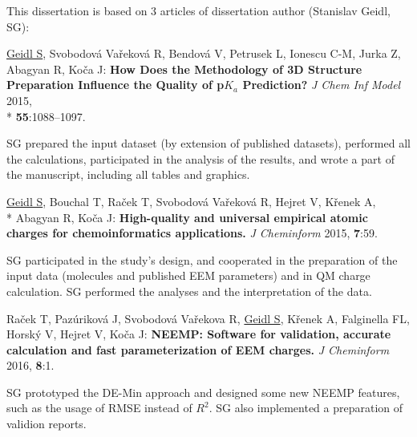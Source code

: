 \documentclass[11pt,b5paper,oneside,final]{book}
\begin{document}
This dissertation is based on 3 articles of dissertation author (Stanislav Geidl, SG): 

\vspace{10mm}

\underline{Geidl S}, Svobodová Vařeková R, Bendová V, Petrusek L, Ionescu C-M,
Jurka Z, Abagyan R, Koča J: \textbf{How Does the Methodology of 3D Structure
Preparation Influence the Quality of p$K_a$ Prediction?} \textit{J Chem Inf Model}
2015, \\* \textbf{55}:1088–1097.

\vspace{5mm}

SG prepared the input dataset (by extension of published datasets), performed
all the calculations, participated in the analysis of the results, and wrote
a part of the manuscript, including all tables and graphics.

\vspace{10mm}

\underline{Geidl S}, Bouchal T, Raček T, Svobodová Vařeková R, Hejret V,
Křenek A,\\* Abagyan R, Koča J: \textbf{High-quality and universal empirical atomic
charges for chemoinformatics applications.} \textit{J Cheminform} 2015,
\textbf{7}:59.

\vspace{5mm}

SG participated in the study's design, and cooperated in the preparation of
the input data (molecules and published EEM parameters) and in QM charge 
calculation. SG performed the analyses and the interpretation of the data.

\vspace{10mm}

Raček T, Pazúriková J, Svobodová Vařekova R, \underline{Geidl S}, Křenek A,
Falginella FL, Horský V, Hejret V, Koča J: \textbf{NEEMP: Software
for validation, accurate calculation and fast parameterization of EEM charges.}
\textit{J Cheminform} 2016, \textbf{8}:1.

\vspace{5mm}

SG prototyped the DE-Min approach and designed some new NEEMP features, such as
the usage of RMSE instead of $R^2$. SG also implemented a preparation of validion
reports.

\clearpage

\tableofcontents

\clearpage
{}
\end{document}
